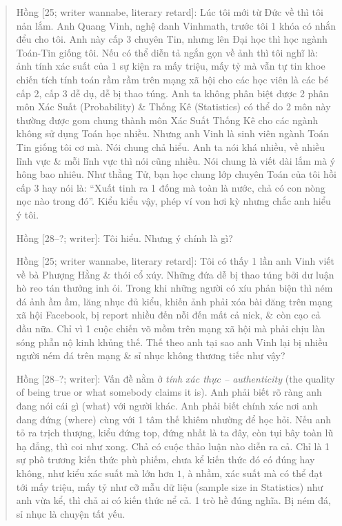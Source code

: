 \documentclass[12pt]{article}
\begin{document}
\begin{quote}
	{\sf Hồng [25; writer wannabe, literary retard]}: Lúc tôi mới từ Đức về thì tôi nản lắm. Anh Quang Vinh, nghệ danh Vinhmath, trước tôi 1 khóa có nhắn đểu cho tôi. Anh này cấp 3 chuyên Tin, nhưng lên Đại học thì học ngành Toán-Tin giống tôi. Nếu có thể diễn tả ngắn gọn về ảnh thì tôi nghĩ là: ảnh tính xác suất của 1 sự kiện ra mấy triệu, mấy tỷ mà vẫn tự tin khoe chiến tích tính toán rầm rầm trên mạng xã hội cho các học viên là các bé cấp 2, cấp 3 dễ dụ, dễ bị thao túng. Anh ta không phân biệt được 2 phân môn Xác Suất (Probability) \& Thống Kê (Statistics) có thể do 2 môn này thường được gom chung thành môn Xác Suất Thống Kê cho các ngành không sử dụng Toán học nhiều. Nhưng anh Vinh là sinh viên ngành Toán Tin giống tôi cơ mà. Nói chung chả hiểu. Anh ta nói khá nhiều, về nhiều lĩnh vực \& mỗi lĩnh vực thì nói cũng nhiều. Nói chung là viết dài lắm mà ý hông bao nhiêu. Như thằng Tử, bạn học chung lớp chuyên Toán của tôi hồi cấp 3 hay nói là: ``Xuất tinh ra 1 đống mà toàn là nước, chả có con nòng nọc nào trong đó''. Kiểu kiểu vậy, phép ví von hơi kỳ nhưng chắc anh hiểu ý tôi.
	
	{\sf Hồng [28--?; writer]}: Tôi hiểu. Nhưng ý chính là gì?
	
	{\sf Hồng [25; writer wannabe, literary retard]}: Tôi có thấy 1 lần anh Vinh viết về bà Phượng Hằng \& thói cổ xúy. Những đứa dễ bị thao túng bởi dư luận hò reo tán thưởng inh ỏi. Trong khi những người có xíu phản biện thì ném đá ảnh ầm ầm, lăng nhục đủ kiểu, khiến ảnh phải xóa bài đăng trên mạng xã hội Facebook, bị report nhiều đến nỗi đến mất cả nick, \& còn cạo cả đầu nữa. Chỉ vì 1 cuộc chiến võ mồm trên mạng xã hội mà phải chịu làn sóng phẫn nộ kinh khủng thế. Thế theo anh tại sao anh Vinh lại bị nhiều người ném đá trên mạng \& sỉ nhục không thương tiếc như vậy?
	
	{\sf Hồng [28--?; writer]}: Vấn đề nằm ở {\it tính xác thực -- authenticity} ({\sf[n] the quality of being true or what somebody claims it is}). Anh phải biết rõ ràng anh đang nói cái gì (what) với người khác. Anh phải biết chính xác nơi anh đang đứng (where) cùng với 1 tâm thế khiêm nhường để học hỏi. Nếu anh tỏ ra trịch thượng, kiểu đứng top, đứng nhất là ta đây, còn tụi bây toàn lũ hạ đẳng, thì coi như xong. Chả có cuộc thảo luận nào diễn ra cả. Chỉ là 1 sự phô trương kiến thức phù phiếm, chưa kể kiến thức đó có đúng hay không, như kiểu xác suất mà lớn hơn $1$, à nhầm, xác suất mà có thể đạt tới mấy triệu, mấy tỷ như cỡ mẫu dữ liệu (sample size in Statistics) như anh vừa kể, thì chả ai có kiến thức nể cả. 1 trò hề đúng nghĩa. Bị ném đá, sỉ nhục là chuyện tất yếu.
	

\end{quote}
\end{document}
